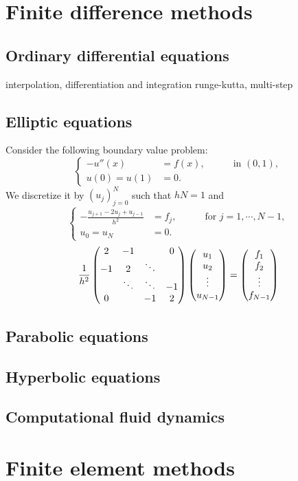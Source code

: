 \documentclass{../../large}
\begin{document}
\chapter{Finite difference methods}
\section{Ordinary differential equations}
interpolation, differentiation and integration
runge-kutta, multi-step
\section{Elliptic equations}
\begin{prb}
Consider the following boundary value problem:
\[\left\{\begin{alignedat}{2}
-u''(x)&=f(x),&\quad&\text{ in }(0,1),\\
u(0)=u(1)&=0.&&
\end{alignedat}\right.\]
We discretize it by $(u_j)_{j=0}^N$ such that $hN=1$ and
\[\left\{\begin{alignedat}{2}
-\frac{u_{j+1}-2u_j+u_{j-1}}{h^2}&=f_j,&\quad&\text{ for }j=1,\cdots,N-1,\\
u_0=u_N&=0.&&
\end{alignedat}\right.\]
\[\frac1{h^2}\begin{pmatrix}2&-1&&0\\-1&2&\ddots&\\&\ddots&\ddots&-1\\0&&-1&2\end{pmatrix}\begin{pmatrix}u_1\\u_2\\\vdots\\u_{N-1}\end{pmatrix}=\begin{pmatrix}f_1\\f_2\\\vdots\\f_{N-1}\end{pmatrix}\]
\end{prb}

\section{Parabolic equations}
\section{Hyperbolic equations}
\section{Computational fluid dynamics}

\chapter{Finite element methods}
\end{document}
